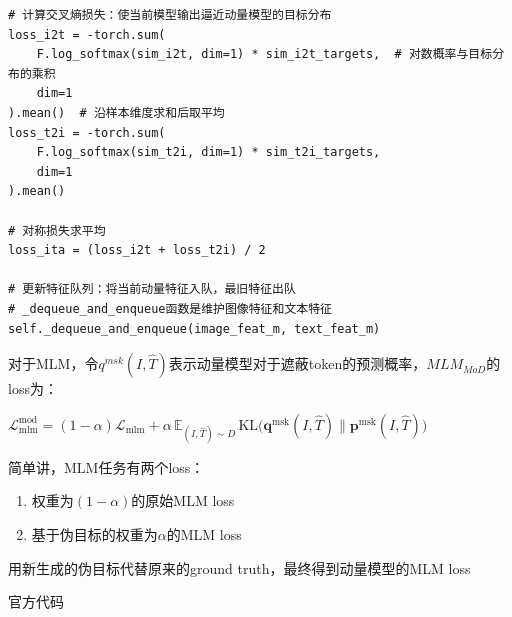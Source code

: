 \documentclass[zihao=false,fontset=windows]{ctexart}
\newcommand{\bigmath}[1]{%
  \begin{center}\large$\displaystyle #1$\end{center}%
}
\begin{document}
\begin{feishucode}
\begin{lstlisting}
# 计算交叉熵损失：使当前模型输出逼近动量模型的目标分布
loss_i2t = -torch.sum(
    F.log_softmax(sim_i2t, dim=1) * sim_i2t_targets,  # 对数概率与目标分布的乘积
    dim=1
).mean()  # 沿样本维度求和后取平均
loss_t2i = -torch.sum(
    F.log_softmax(sim_t2i, dim=1) * sim_t2i_targets,
    dim=1
).mean() 

# 对称损失求平均
loss_ita = (loss_i2t + loss_t2i) / 2

# 更新特征队列：将当前动量特征入队，最旧特征出队
# _dequeue_and_enqueue函数是维护图像特征和文本特征
self._dequeue_and_enqueue(image_feat_m, text_feat_m)
\end{lstlisting}
\end{feishucode}
\vspace{0.45em}
对于MLM，令$q^{msk}(I,\hat{T})$表示动量模型对于遮蔽token的预测概率，$MLM_{MoD}$的loss为：\par
\bigmath{
\mathcal{L}_{\mathrm{mlm}}^{\mathrm{mod}}=(1-\alpha)\mathcal{L}_{\mathrm{mlm}}+\alpha\,\mathbb{E}_{(I,\hat{T})\sim D}\,\mathrm{KL}\bigl(\mathbf{q}^{\mathrm{msk}}(I,\hat{T})\parallel\mathbf{p}^{\mathrm{msk}}(I,\hat{T})\bigr)
}
\begin{feishuquote}
简单讲，MLM任务有两个loss：\par
\begin{enumerate}
\item 权重为$(1-\alpha)$的原始MLM loss
\item 基于伪目标的权重为$\alpha$的MLM loss
\end{enumerate}
用新生成的伪目标代替原来的ground truth，最终得到动量模型的MLM loss\par
\end{feishuquote}
官方代码\par
\end{document}
